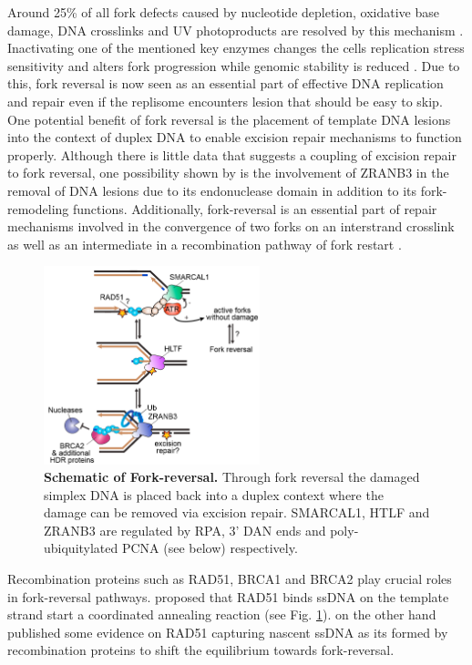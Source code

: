Around 25\% of all fork defects caused by nucleotide depletion, oxidative base damage, DNA crosslinks and UV photoproducts are resolved by this mechanism \citep{Zellweger.2015}. Inactivating one of the mentioned key enzymes changes the cells replication stress sensitivity and alters fork progression while genomic stability is reduced \citep{Ciccia.2010, Yuan.2009}. Due to this, fork reversal is now seen as an essential part of effective DNA replication and repair even if the replisome encounters lesion that should be easy to skip. One potential benefit of fork reversal is the placement of template DNA lesions into the context of duplex DNA to enable excision repair mechanisms to function properly. Although there is little data that suggests a coupling of excision repair to fork reversal, one possibility shown by \citet{Weston.2012} is the involvement of ZRANB3 in the removal of DNA lesions due to its endonuclease domain in addition to its fork-remodeling functions. Additionally, fork-reversal is an essential part of repair mechanisms involved in the convergence of two forks on an interstrand crosslink as well as an intermediate in a recombination pathway of fork restart \citep{Amunugama.2018}.
\begin{figure}
    \includegraphics[width=0.56\textwidth]{resources/images/Intro/forkreversal.PNG}
    \caption[Schematic of Fork-reversal]{\textbf{Schematic of Fork-reversal.} Through fork reversal the damaged simplex DNA is placed back into a duplex context where the damage can be removed via excision repair. SMARCAL1, HTLF and ZRANB3 are regulated by RPA, 3' DAN ends and poly-ubiquitylated PCNA (see below) respectively. \citep{Cortez.2019}}
    \label{fig:forkreversal}
\end{figure}
Recombination proteins such as RAD51, BRCA1 and BRCA2 play crucial roles in fork-reversal pathways. \cite{Neelsen.2015} proposed that RAD51 binds ssDNA on the template strand start a coordinated annealing reaction (see Fig. \ref{fig:forkreversal}). \cite{Bhat.2018} on the other hand published some evidence on RAD51 capturing nascent ssDNA  as its formed by recombination proteins to shift the equilibrium towards fork-reversal.\\
